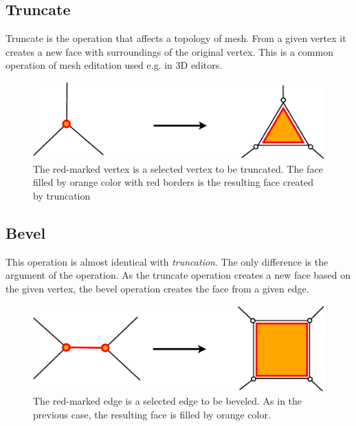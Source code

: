 \subsection{Truncate}

Truncate is the operation that affects a topology of mesh. From a given vertex it creates a new face with
surroundings of the original vertex. This is a common operation of mesh editation used e.g. in
3D editors.\\

\begin{figure}[ht]
\includegraphics[scale=0.2]{../img/truncate.eps}
\caption{The red-marked vertex is a selected vertex to be truncated.
The face filled by orange color with red borders is the resulting face created by truncation}
\end{figure}


\subsection{Bevel}

This operation is almost identical with \emph{truncation}. The only difference is the argument of the
operation. As the truncate operation creates a new face based on the given vertex, the bevel operation
creates the face from a given edge.\\

\begin{figure}[ht]
\includegraphics[scale=0.2]{../img/bevel.eps}
\caption{The red-marked edge is a selected edge to be beveled. As in the previous case, the resulting
face is filled by orange color.}
\end{figure}



